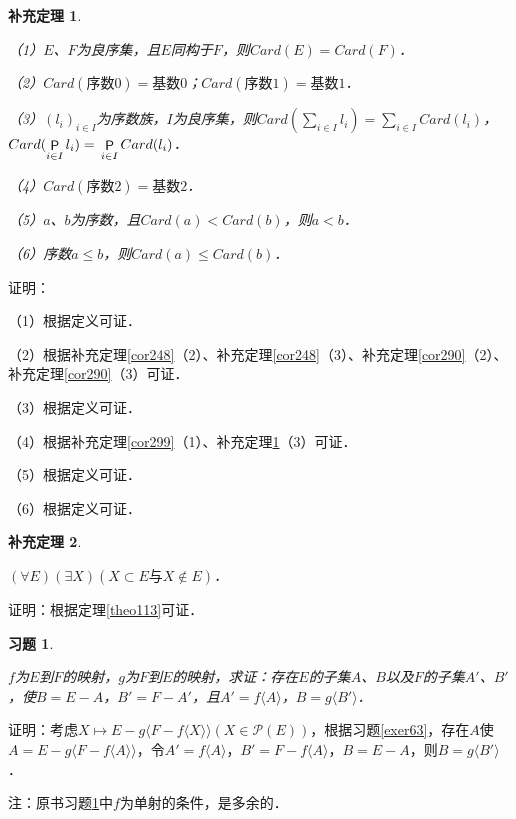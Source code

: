 \documentclass[12pt, a4paper, oneside]{book}
\newtheorem{cor}{补充定理}
\newtheorem{exer}{习题}
\begin{document}
			\begin{cor}\label{cor301}
				\hfill\par
				（1）$E$、$F$为良序集，且$E$同构于$F$，则$Card(E)=Card(F)$．
				\par
				（2）$Card(\text{序数}0)=\text{基数}0$；$Card(\text{序数}1)=\text{基数}1$．
				\par
				（3）$(l_i)_{i\in I}$为序数族，$I$为良序集，则$Card(\sum\limits_{i\in I}l_i)= \sum\limits_{i\in I}Card(l_i)$，$Card(\mathop{\mathsf{P}}\limits_{i\in I}l_i)=\\\mathop{\mathsf{P}}\limits_{i\in I}Card(l_i)$．
				\par
				（4）$Card(\text{序数}2)=\text{基数}2$．
				\par
				（5）$a$、$b$为序数，且$Card(a)<Card(b)$，则$a<b$．
				\par
				（6）序数$a\leq b$，则$Card(a)\leq Card(b)$．
			\end{cor}
			证明：
			\par			
			（1）根据定义可证．
			\par
			（2）根据补充定理\ref{cor248}（2）、补充定理\ref{cor248}（3）、补充定理\ref{cor290}（2）、补充定理\ref{cor290}（3）可证．
			\par
			（3）根据定义可证．
			\par
			（4）根据补充定理\ref{cor299}（1）、补充定理\ref{cor301}（3）可证．
			\par
			（5）根据定义可证．
			\par
			（6）根据定义可证．
			
			\begin{cor}\label{cor302}
				\hfill\par
				$(\forall E)(\exists X)(X\subset E\text{与}X \notin E)$．
			\end{cor}
			证明：根据定理\ref{theo113}可证．
			
			\begin{exer}\label{exer121}
				\hfill\par
				$f$为$E$到$F$的映射，$g$为$F$到$E$的映射，求证：存在$E$的子集$A$、$B$以及$F$的子集$A'$、$B'$，使$B=E-A$，$B'=F-A'$，且$A'=f\langle A\rangle$，$B=g\langle B'\rangle$．
			\end{exer}
			证明：考虑$X\mapsto E-g\langle F-f\langle X\rangle\rangle(X\in \mathcal{P}(E))$，根据习题\ref{exer63}，存在$A$使$A= E-g\langle F-f\langle A\rangle\rangle$，令$A'=f\langle A\rangle$，$B'=F-f\langle A\rangle$，$B=E-A$，则$B=g\langle B'\rangle$．
			\par
			注：原书习题\ref{exer121}中$f$为单射的条件，是多余的．
			
\end{document}
